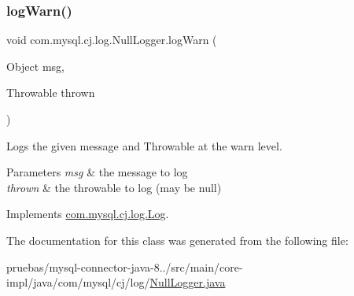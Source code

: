 \subsubsection{\texorpdfstring{log\+Warn()}{logWarn()}\hspace{0.1cm}{\footnotesize\ttfamily [2/2]}}
{\footnotesize\ttfamily void com.\+mysql.\+cj.\+log.\+Null\+Logger.\+log\+Warn (\begin{DoxyParamCaption}\item[{Object}]{msg,  }\item[{Throwable}]{thrown }\end{DoxyParamCaption})}

Logs the given message and Throwable at the \textquotesingle{}warn\textquotesingle{} level.


\begin{DoxyParams}{Parameters}
{\em msg} & the message to log \\
\hline
{\em thrown} & the throwable to log (may be null) \\
\hline
\end{DoxyParams}


Implements \mbox{\hyperlink{interfacecom_1_1mysql_1_1cj_1_1log_1_1_log_a36af866ddfdda47938c768d3d0e68572}{com.\+mysql.\+cj.\+log.\+Log}}.



The documentation for this class was generated from the following file\+:\begin{DoxyCompactItemize}
\item 
pruebas/mysql-\/connector-\/java-\/8../src/main/core-\/impl/java/com/mysql/cj/log/\mbox{\hyperlink{_null_logger_8java}{Null\+Logger.\+java}}\end{DoxyCompactItemize}
